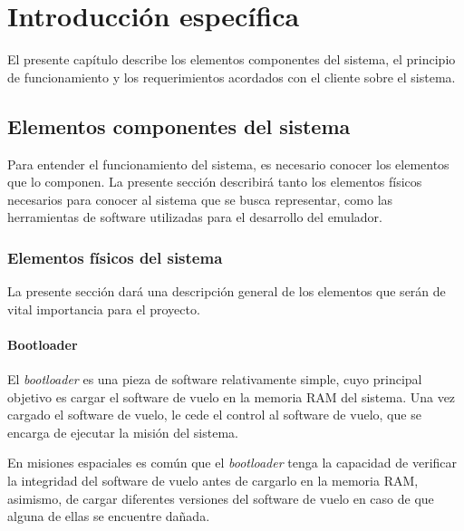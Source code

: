 \chapter{Introducción específica} %

El presente capítulo describe los elementos componentes del sistema, el principio de funcionamiento y los requerimientos acordados con el cliente sobre el sistema.


\label{Chapter2}



\section{Elementos componentes del sistema}
\label{sec:elementos_componentes_sistema}

Para entender el funcionamiento del sistema, es necesario conocer los elementos que lo componen. La presente sección describirá tanto los elementos físicos necesarios para conocer al sistema que se busca representar, como las herramientas de software utilizadas para el desarrollo del emulador.

\subsection{Elementos físicos del sistema}
\label{subsec:elementos_fisicos}

La presente sección dará una descripción general de los elementos que serán de vital importancia para el proyecto.

\subsubsection{Bootloader}
\label{subsec:bootloader}

El \textit{bootloader} es una pieza de software relativamente simple, cuyo principal objetivo es cargar el software de vuelo en la memoria RAM del sistema. Una vez cargado el software de vuelo, le cede el control al software de vuelo, que se encarga de ejecutar la misión del sistema.

En misiones espaciales es común que el \textit{bootloader} tenga la capacidad de verificar la integridad del software de vuelo antes de cargarlo en la memoria RAM, asimismo, de cargar diferentes versiones del software de vuelo en caso de que alguna de ellas se encuentre dañada.

